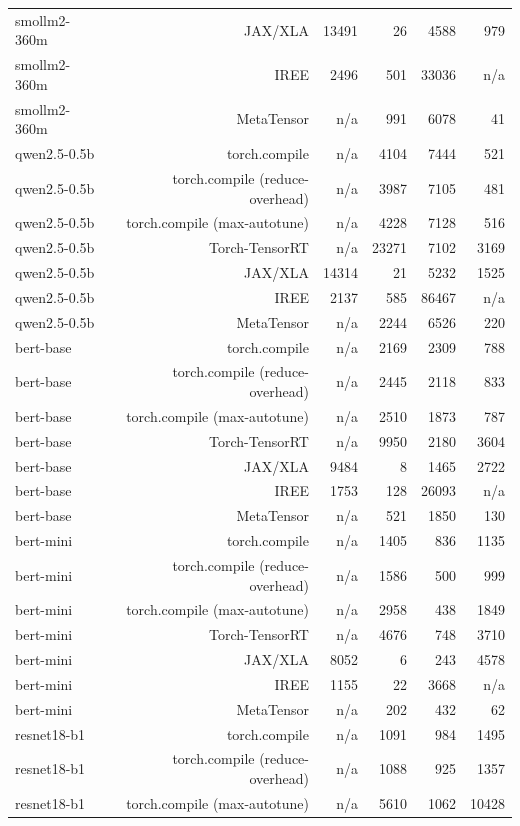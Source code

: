 \begin{tabular}{lrrrrr}
smollm2-360m & JAX/XLA & 13491 & 26 & 4588 & 979 \\
smollm2-360m & IREE & 2496 & 501 & 33036 & n/a \\
smollm2-360m & MetaTensor & n/a & 991 & 6078 & 41 \\
qwen2.5-0.5b & torch.compile & n/a & 4104 & 7444 & 521 \\
qwen2.5-0.5b & torch.compile (reduce-overhead) & n/a & 3987 & 7105 & 481 \\
qwen2.5-0.5b & torch.compile (max-autotune) & n/a & 4228 & 7128 & 516 \\
qwen2.5-0.5b & Torch-TensorRT & n/a & 23271 & 7102 & 3169 \\
qwen2.5-0.5b & JAX/XLA & 14314 & 21 & 5232 & 1525 \\
qwen2.5-0.5b & IREE & 2137 & 585 & 86467 & n/a \\
qwen2.5-0.5b & MetaTensor & n/a & 2244 & 6526 & 220 \\
bert-base & torch.compile & n/a & 2169 & 2309 & 788 \\
bert-base & torch.compile (reduce-overhead) & n/a & 2445 & 2118 & 833 \\
bert-base & torch.compile (max-autotune) & n/a & 2510 & 1873 & 787 \\
bert-base & Torch-TensorRT & n/a & 9950 & 2180 & 3604 \\
bert-base & JAX/XLA & 9484 & 8 & 1465 & 2722 \\
bert-base & IREE & 1753 & 128 & 26093 & n/a \\
bert-base & MetaTensor & n/a & 521 & 1850 & 130 \\
bert-mini & torch.compile & n/a & 1405 & 836 & 1135 \\
bert-mini & torch.compile (reduce-overhead) & n/a & 1586 & 500 & 999 \\
bert-mini & torch.compile (max-autotune) & n/a & 2958 & 438 & 1849 \\
bert-mini & Torch-TensorRT & n/a & 4676 & 748 & 3710 \\
bert-mini & JAX/XLA & 8052 & 6 & 243 & 4578 \\
bert-mini & IREE & 1155 & 22 & 3668 & n/a \\
bert-mini & MetaTensor & n/a & 202 & 432 & 62 \\
resnet18-b1 & torch.compile & n/a & 1091 & 984 & 1495 \\
resnet18-b1 & torch.compile (reduce-overhead) & n/a & 1088 & 925 & 1357 \\
resnet18-b1 & torch.compile (max-autotune) & n/a & 5610 & 1062 & 10428 \\

\end{tabular}
